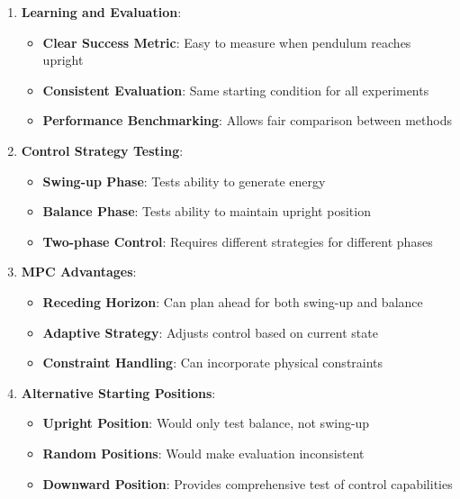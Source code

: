 \begin{itemize}
\begin{enumerate}
        \item \textbf{Learning and Evaluation}:
        \begin{itemize}
            \item \textbf{Clear Success Metric}: Easy to measure when pendulum reaches upright
            \item \textbf{Consistent Evaluation}: Same starting condition for all experiments
            \item \textbf{Performance Benchmarking}: Allows fair comparison between methods
        \end{itemize}
        
        \item \textbf{Control Strategy Testing}:
        \begin{itemize}
            \item \textbf{Swing-up Phase}: Tests ability to generate energy
            \item \textbf{Balance Phase}: Tests ability to maintain upright position
            \item \textbf{Two-phase Control}: Requires different strategies for different phases
        \end{itemize}
        
        \item \textbf{MPC Advantages}:
        \begin{itemize}
            \item \textbf{Receding Horizon}: Can plan ahead for both swing-up and balance
            \item \textbf{Adaptive Strategy}: Adjusts control based on current state
            \item \textbf{Constraint Handling}: Can incorporate physical constraints
        \end{itemize}
        
        \item \textbf{Alternative Starting Positions}:
        \begin{itemize}
            \item \textbf{Upright Position}: Would only test balance, not swing-up
            \item \textbf{Random Positions}: Would make evaluation inconsistent
            \item \textbf{Downward Position}: Provides comprehensive test of control capabilities
        \end{itemize}
    \end{enumerate}
    

\end{itemize}
